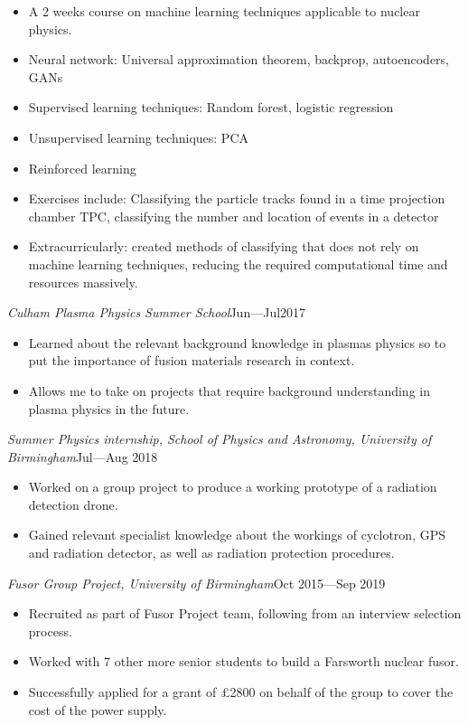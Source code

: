 \documentclass[a4paper, 12pt]{article}
\newcommand{\expentry}[3]{\emph{#1}\hfill{#2}---{#3}}
\begin{document}
    \begin{itemize}
    \item A 2 weeks course on machine learning techniques applicable to nuclear physics.
    \item Neural network: Universal approximation theorem, backprop, autoencoders, GANs
    \item Supervised learning techniques: Random forest, logistic regression
    \item Unsupervised learning techniques: PCA
    \item Reinforced learning
    \item Exercises include: Classifying the particle tracks found in a time projection chamber TPC, classifying the number and location of events in a detector
    \item Extracurricularly: created methods of classifying that does not rely on machine learning techniques, reducing the required computational time and resources massively.
    \end{itemize}
\expentry{Culham Plasma Physics Summer School}{Jun}{Jul2017}
    \begin{itemize}
    \setlength\itemsep{0em}
    \item Learned about the relevant background knowledge in plasmas physics so to put the importance of fusion materials research in context.
    \item Allows me to take on projects that require background understanding in plasma physics in the future.
    \end{itemize}
\expentry{Summer Physics internship, School of Physics and Astronomy, University of Birmingham}{Jul}{Aug 2018}
    \begin{itemize}
    \setlength\itemsep{0em}
    \item Worked on a group project to produce a working prototype of a radiation detection drone.
    \item Gained relevant specialist knowledge about the workings of cyclotron, GPS and radiation detector, as well as radiation protection procedures.
    \end{itemize}
\expentry{Fusor Group Project, University of Birmingham}{Oct 2015}{Sep 2019}
    \begin{itemize}
    \setlength\itemsep{0em}
    \item Recruited as part of Fusor Project team, following from an interview selection process.
    \item Worked with 7 other more senior students to build a Farsworth nuclear fusor.
    \item Successfully applied for a grant of \pounds 2800 on behalf of the group to cover the cost of the power supply. 
    \end{itemize}
\end{document}
